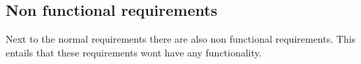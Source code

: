 \subsection{Non functional requirements}
Next to the normal requirements there are also non functional requirements. This entails that these requirements wont have any functionality.



